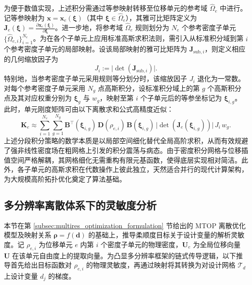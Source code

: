 为便于数值实现，上述积分需通过等参映射转移至位移单元的参考域 $\hat{\Omega}_e$ 中进行。记等参映射为 $\boldsymbol{x}=\boldsymbol{x}_e(\boldsymbol\xi)$（其中 $\boldsymbol\xi\in\hat{\Omega}_e$），其雅可比矩阵定义为 $\boldsymbol{J}_e(\boldsymbol\xi)=\frac{\partial\boldsymbol{x}_e(\boldsymbol\xi)}{\partial\boldsymbol\xi}$。进一步地，将参考域 $\hat{\Omega}_e$ 规则划分为 $N_e$ 个参考密度子单元 $\{\hat{\Omega}_{e,i}\}_{i=1}^{N_e}$。为在各个子单元上应用标准高斯求积法则，需引入从标准积分域到第 $i$ 个参考密度子单元的局部映射。设该局部映射的雅可比矩阵为 $\boldsymbol{J}_{\text{sub},i}$，则定义相应的几何缩放因子为
\[
J_i:=\big|\det(\boldsymbol{J}_{\text{sub},i})\big|.
\]
特别地，当参考密度子单元采用规则等分划分时，该缩放因子 $J_i$ 退化为一常数。 对每个参考密度子单元采用 $N_g$ 点高斯积分，设标准积分域上的第 $g$ 个高斯积分点及其对应权重分别为 $\boldsymbol\xi_{g}$ 与 $w_g$，映射至第 $i$ 个子单元后的等参坐标记为 $\boldsymbol\xi_{i,g}$。此时，单元刚度矩阵可由以下离散求和公式高精度近似：
\begin{equation} \label{eq:ch4_subcell_stiffness}
	\boldsymbol{K}_e \approx \sum_{i=1}^{N_e}\sum_{g=1}^{N_g} \boldsymbol{B}^{\top}(\boldsymbol\xi_{i,g})\,\boldsymbol{D}(\rho_{e,i})\,\boldsymbol{B}(\boldsymbol\xi_{i,g})\, \big|\det(\boldsymbol{J}_e(\boldsymbol\xi_{i,g}))\big|\, J_i\, w_g.
\end{equation}
上述分段积分策略的数学本质是以局部空间细化替代全局高阶求积，从而有效规避了强非线性密度场在粗网格上引发的积分震荡与病态。由于密度积分网格与位移插值空间严格解耦，其网格细化无需重构有限元基函数，使得底层实现相对简洁。此外，各子单元的高斯求积在代数操作上彼此独立，天然适合并行的现代计算架构，为大规模高阶拓扑优化奠定了算法基础。


\subsection{多分辨率离散体系下的灵敏度分析}
\label{subsec:sensitivity_analysis}

本节在第 \ref{subsec:multires_optimization_formulation} 节给出的 MTOP 离散优化模型及映射关系 $\boldsymbol\rho=f(\boldsymbol{d})$ 的基础上，推导柔顺度目标关于设计变量的解析灵敏度。记 $\rho_{e,i}$ 为位移单元 $e$ 内第 $i$ 个密度子单元的物理密度，$\boldsymbol U_e$ 为全局位移向量 $\boldsymbol U$ 在该单元自由度上的提取向量。为凸显多分辨率框架的链式传导逻辑，以下推导首先给出目标函数对 $\rho_{e,i}$ 的物理灵敏度，再通过映射将其转换为对设计网格 $\mathcal{T}_d$ 上设计变量 $d_{j}$ 的梯度。

